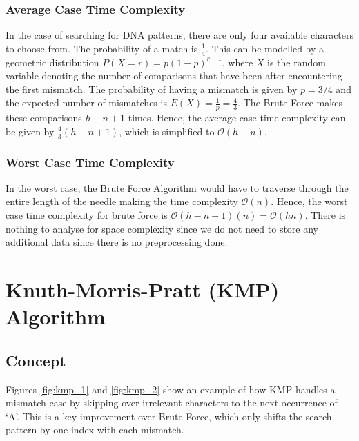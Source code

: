 \subsubsection*{Average Case Time Complexity}
In the case of searching for DNA patterns, there are only four available characters to choose from. The probability of a match is $\frac{1}{4}$. This can be modelled by a geometric distribution $P(X=r) = p(1-p)^{r-1}$, where $X$ is the random variable denoting the number of comparisons that have been after encountering the first mismatch. The probability of having a mismatch is given by $p = 3/4$ and the expected number of mismatches is $E(X) = \frac{1}{p} = \frac{4}{3}$. The Brute Force makes these comparisons $h-n+1$ times. Hence, the average case time complexity can be given by $\frac{4}{3}(h-n+1)$, which is simplified to $\mathcal{O}(h-n)$.

\subsubsection*{Worst Case Time Complexity}
In the worst case, the Brute Force Algorithm would have to traverse through the entire length of the needle making the time complexity $\mathcal{O}(n)$. Hence, the worst case time complexity for brute force is $\mathcal{O}(h - n + 1)(n) = \mathcal{O}(hn)$. There is nothing to analyse for space complexity since we do not need to store any additional data since there is no preprocessing done.

\section*{Knuth-Morris-Pratt (KMP) Algorithm}

\subsection*{Concept}
Figures \ref{fig:kmp_1} and \ref{fig:kmp_2} show an example of how KMP handles a mismatch case by skipping over irrelevant characters to the next occurrence of `A'. This is a key improvement over Brute Force, which only shifts the search pattern by one index with each mismatch. 



